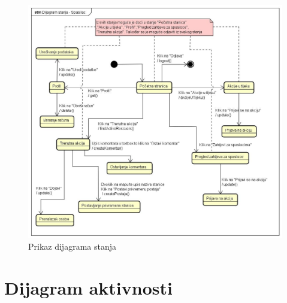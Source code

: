 		\begin{figure}[h!]
			\centering
			\includegraphics[width=\linewidth]{./slike/Dijagram stanja - Spasilac.jpg}
			\caption{Prikaz dijagrama stanja}
		
		\end{figure}
	
	
	\eject 
	
	\section{Dijagram aktivnosti}
	
